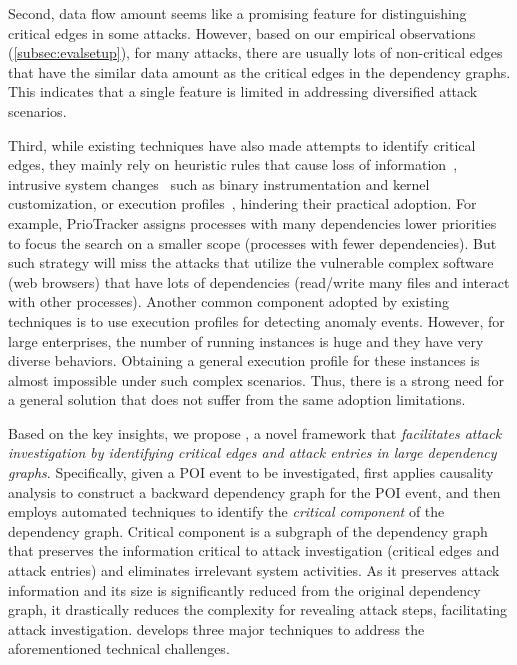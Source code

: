 Second, data flow amount seems like a promising feature for distinguishing critical edges in some attacks.
However, based on our empirical observations (\cref{subsec:evalsetup}), for many attacks, there are usually lots of non-critical edges that have the similar data amount as the critical edges in the dependency graphs.
This indicates that a single feature is limited in addressing diversified attack scenarios. 


Third, while existing techniques have also made attempts to identify critical edges, they mainly rely on heuristic rules that cause loss of information~\cite{backtracking}, intrusive system changes~\cite{ma2016protracer,mcitracking} such as binary instrumentation and kernel customization, or execution profiles~\cite{hassan2019nodoze}, hindering their practical adoption. 
For example, PrioTracker\cite{liu2018priotracker} assigns processes with many dependencies lower priorities to focus the search on a smaller scope (\ie processes with fewer dependencies).
But such strategy will miss the attacks that utilize the vulnerable complex software (\eg web browsers) that have lots of dependencies (\eg read/write many files and interact with other processes).
Another common component adopted by existing techniques is to use execution profiles for detecting anomaly events. 
However, for large enterprises, the number of running instances is huge and they have very diverse behaviors. 
Obtaining a general execution profile for these instances is almost impossible under such complex scenarios.
Thus, there is a strong need for a general solution that does not suffer from the same adoption limitations.


Based on the key insights, we propose \tool, a novel framework that \emph{facilitates attack investigation by identifying critical edges and attack entries in large dependency graphs}. 
Specifically, given a POI event to be investigated, 
\tool first applies causality analysis to construct a backward dependency graph for the POI event, and then employs automated techniques to identify the \emph{critical component} of the dependency graph.
Critical component is a subgraph of the dependency graph that preserves the information critical to attack investigation (\ie critical edges and attack entries)
and eliminates irrelevant system activities.
As it preserves attack information and its size is significantly reduced from the original dependency graph, it drastically reduces the complexity for revealing attack steps, facilitating attack investigation.
\tool develops three major techniques to address the aforementioned technical challenges. 

